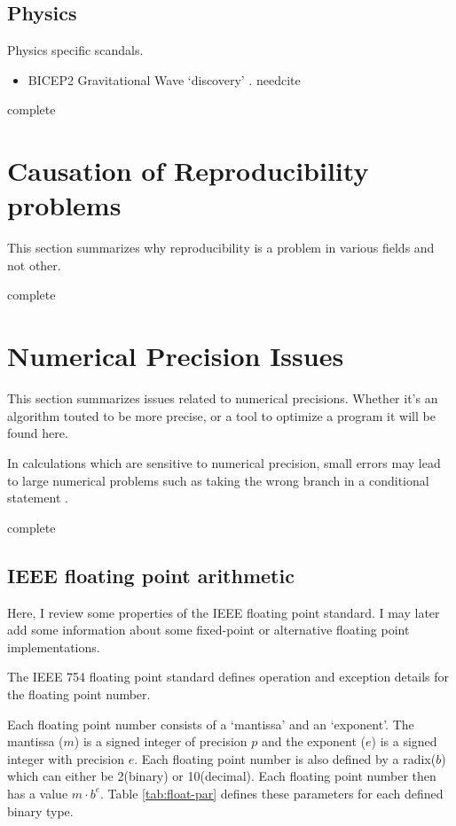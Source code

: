 \documentclass[american]{article}
\newcommand{\complete}{
	\gls{complete}
}
\newcommand{\needcite}{
	\gls{needcite}
}
\begin{document}
\subsection{Physics}

Physics specific scandals.

\begin{itemize}
\item BICEP2 Gravitational Wave `discovery' \cite{dhb-zurich-hp}. \needcite
\end{itemize}

\complete

\section{Causation of Reproducibility problems}

This section summarizes why reproducibility is a problem in various fields and not other.
\complete

\section{Numerical Precision Issues}

This section summarizes issues related to numerical precisions. Whether it's an algorithm touted to be more precise, or a tool to optimize a program it will be found here.

In calculations which are sensitive to numerical precision, small errors may lead to large numerical problems such as taking the wrong branch in a conditional statement \cite{high-precision-arith-in-science}.

\complete

\subsection{IEEE floating point arithmetic}

Here, I review some properties of the IEEE floating point standard. I may later add some information about some fixed-point or alternative floating point implementations.

The IEEE 754 floating point standard \cite{ieee-754-2008,ieee-754-2008-redline} defines operation and exception details for the floating point number.

Each floating point number consists of a `mantissa' and an `exponent'. The mantissa ($m$) is a signed integer of precision $p$ and the exponent ($e$) is a signed integer with precision $e$. Each floating point number is also defined by a radix($b$) which can either be 2(binary) or 10(decimal). Each floating point number then has a value $m\cdot b^e$. Table \ref{tab:float-par} defines these parameters for each defined binary type.
\end{document}
